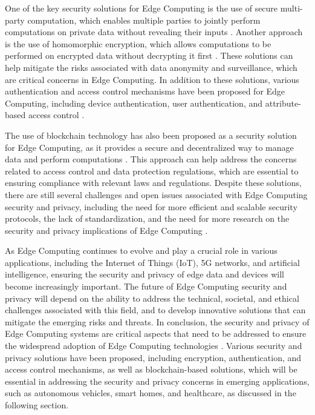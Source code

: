 \documentclass[11pt,a4paper]{article}
\begin{document}
One of the key security solutions for Edge Computing is the use of secure multi-party computation, which enables multiple parties to jointly perform computations on private data without revealing their inputs \cite{arxiv:2211.05851}. Another approach is the use of homomorphic encryption, which allows computations to be performed on encrypted data without decrypting it first \cite{arxiv:1807.00976}. These solutions can help mitigate the risks associated with data anonymity and surveillance, which are critical concerns in Edge Computing. In addition to these solutions, various authentication and access control mechanisms have been proposed for Edge Computing, including device authentication, user authentication, and attribute-based access control \cite{arxiv:1906.00711}.

The use of blockchain technology has also been proposed as a security solution for Edge Computing, as it provides a secure and decentralized way to manage data and perform computations \cite{arxiv:2407.05963}. This approach can help address the concerns related to access control and data protection regulations, which are essential to ensuring compliance with relevant laws and regulations. Despite these solutions, there are still several challenges and open issues associated with Edge Computing security and privacy, including the need for more efficient and scalable security protocols, the lack of standardization, and the need for more research on the security and privacy implications of Edge Computing \cite{arxiv:2206.07164}.

As Edge Computing continues to evolve and play a crucial role in various applications, including the Internet of Things (IoT), 5G networks, and artificial intelligence, ensuring the security and privacy of edge data and devices will become increasingly important. The future of Edge Computing security and privacy will depend on the ability to address the technical, societal, and ethical challenges associated with this field, and to develop innovative solutions that can mitigate the emerging risks and threats. In conclusion, the security and privacy of Edge Computing systems are critical aspects that need to be addressed to ensure the widespread adoption of Edge Computing technologies \cite{arxiv:2201.00242}. Various security and privacy solutions have been proposed, including encryption, authentication, and access control mechanisms, as well as blockchain-based solutions, which will be essential in addressing the security and privacy concerns in emerging applications, such as autonomous vehicles, smart homes, and healthcare, as discussed in the following section.
\end{document}
